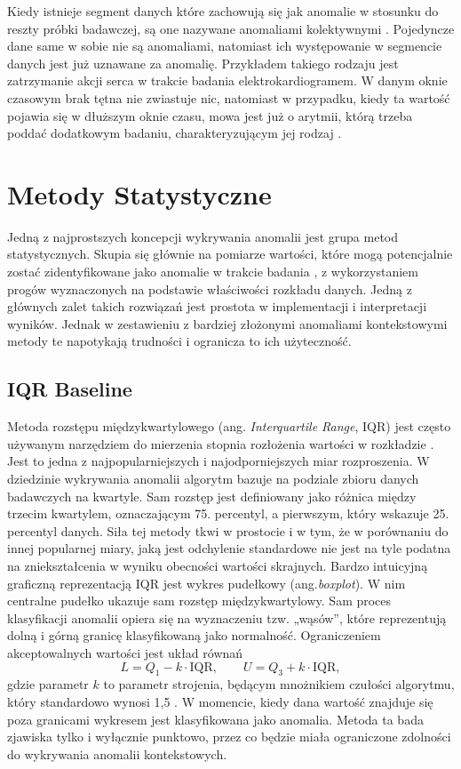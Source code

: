 \documentclass[a4paper,twoside,12pt]{book}
\newcommand{\obcy}[1]{\emph{#1}}
\newcommand{\english}[1]{{\selectlanguage{british}\obcy{#1}}}
\begin{document}
	Kiedy istnieje segment danych które zachowują się jak anomalie w stosunku do reszty próbki badawczej, są one nazywane anomaliami kolektywnymi \cite{chandola2009anomaly}. Pojedyncze dane same w sobie nie są anomaliami, natomiast ich występowanie w segmencie danych jest już uznawane za anomalię. Przykładem takiego rodzaju jest zatrzymanie akcji serca w trakcie badania elektrokardiogramem. W danym oknie czasowym brak tętna nie zwiastuje nic, natomiast w przypadku, kiedy ta wartość pojawia się w dłuższym oknie czasu, mowa jest już o arytmii, którą trzeba poddać dodatkowym badaniu, charakteryzującym jej rodzaj \cite{chandola2009anomaly}.
	
	\section{Metody Statystyczne}
	Jedną z najprostszych koncepcji wykrywania anomalii jest grupa metod statystycznych. Skupia się głównie na pomiarze wartości, które mogą potencjalnie zostać zidentyfikowane jako anomalie w trakcie badania \cite{lenart2024comparison}, z wykorzystaniem progów wyznaczonych na podstawie właściwości rozkładu danych. Jedną z głównych zalet takich rozwiązań jest prostota w implementacji i interpretacji wyników. Jednak w zestawieniu z bardziej złożonymi anomaliami kontekstowymi metody te napotykają trudności i ogranicza to ich użyteczność. 
	
	\subsection{IQR Baseline}
	Metoda rozstępu międzykwartylowego (ang. \english{Interquartile Range}, IQR) jest często używanym narzędziem do mierzenia stopnia rozłożenia wartości w rozkładzie \cite{kang2005q}. Jest to jedna z najpopularniejszych i najodporniejszych miar rozproszenia. W dziedzinie wykrywania anomalii algorytm bazuje na podziale zbioru danych badawczych na kwartyle. Sam rozstęp jest definiowany jako różnica między trzecim kwartylem, oznaczającym 75. percentyl, a pierwszym, który wskazuje 25. percentyl danych. Siła tej metody tkwi w prostocie i w tym, że w porównaniu do innej popularnej miary, jaką jest odchylenie standardowe nie jest na tyle podatna na zniekształcenia w wyniku obecności wartości skrajnych. 
	Bardzo intuicyjną graficzną reprezentacją IQR jest wykres pudełkowy  (ang.\english{boxplot}). W nim centralne pudełko ukazuje sam rozstęp międzykwartylowy. Sam proces klasyfikacji anomalii opiera się na wyznaczeniu tzw. „wąsów”, które reprezentują dolną i górną granicę klasyfikowaną jako normalność. Ograniczeniem akceptowalnych wartości jest układ równań
	\begin{equation}
		L = Q_1 - k \cdot \text{IQR}, \qquad
		U = Q_3 + k \cdot \text{IQR},
		\label{eq:iqr}
	\end{equation}
	 gdzie parametr $k$ to parametr strojenia, będącym mnożnikiem czułości algorytmu, który standardowo wynosi 1{,}5 \cite{migdadi2019robust}. W momencie, kiedy dana wartość znajduje się poza granicami wykresem jest klasyfikowana jako anomalia. Metoda ta bada zjawiska tylko i wyłącznie punktowo, przez co będzie miała ograniczone zdolności do wykrywania anomalii kontekstowych.
	
\end{document}
